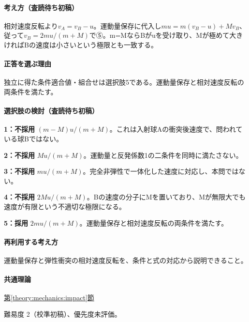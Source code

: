 \paragraph{考え方（査読待ち初稿）} 相対速度反転より\(v_A=v_B-u\)。運動量保存に代入し\(mu=m(v_B-u)+Mv_B\)、従って\(v_B=2mu/(m+M)\)で⑤。m=MならBがuを受け取り、Mが極めて大きければBの速度は小さいという極限とも一致する。

\paragraph{正答を選ぶ理由} 独立に得た条件適合値・組合せは選択肢5である。運動量保存と相対速度反転の両条件を満たす。

\paragraph{選択肢の検討（査読待ち初稿）}

\noindent\textbf{1：不採用} \((m-M)u/(m+M)\)。これは入射球Aの衝突後速度で、問われている球Bではない。\par

\noindent\textbf{2：不採用} \(Mu/(m+M)\)。運動量と反発係数1の二条件を同時に満たさない。\par

\noindent\textbf{3：不採用} \(mu/(m+M)\)。完全非弾性で一体化した速度に対応し、本問ではない。\par

\noindent\textbf{4：不採用} \(2Mu/(m+M)\)。Bの速度の分子にMを置いており、Mが無限大でも速度が有限という不適切な極限になる。\par

\noindent\textbf{5：採用} \(2mu/(m+M)\)。運動量保存と相対速度反転の両条件を満たす。\par

\paragraph{再利用する考え方} 運動量保存と弾性衝突の相対速度反転を、条件と式の対応から説明できること。

\paragraph{共通理論} \hyperref[theory:mechanics:impact]{第\ref*{theory:mechanics:impact}節}

\par 難易度 2（校準初稿）、優先度未評価。

